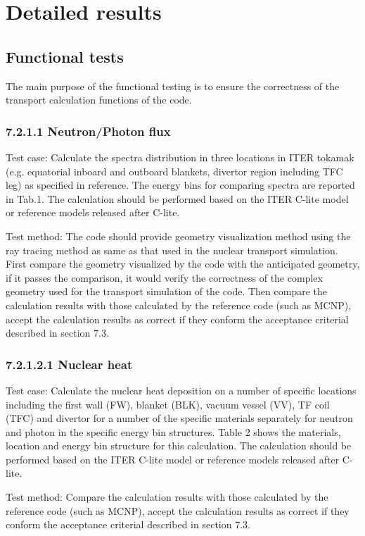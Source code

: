 \section{Detailed results}
\label{detailedresults}

\subsection{Functional tests}
The main purpose of the functional testing is to ensure the correctness of the transport
calculation functions of the code.

\subsubsection{7.2.1.1 Neutron/Photon flux}
Test case: Calculate the spectra distribution in three locations in ITER tokamak (e.g.
equatorial inboard and outboard blankets, divertor region including TFC leg) as
specified in reference. The energy bins for comparing spectra are reported in Tab.1.
The calculation should be performed based on the ITER C-lite model or reference
models released after C-lite.

Test method: The code should provide geometry visualization method using the ray
tracing method as same as that used in the nuclear transport simulation. First compare
the geometry visualized by the code with the anticipated geometry, if it passes the
comparison, it would verify the correctness of the complex geometry used for the
transport simulation of the code. Then compare the calculation results with those
calculated by the reference code (such as MCNP), accept the calculation results as
correct if they conform the acceptance criterial described in section 7.3.

\subsubsection{7.2.1.2.1 Nuclear heat}
Test case: Calculate the nuclear heat deposition on a number of specific locations
including the first wall (FW), blanket (BLK), vacuum vessel (VV), TF coil (TFC) and
divertor for a number of the specific materials separately for neutron and photon in the
specific energy bin structures. Table 2 shows the materials, location and energy bin
structure for this calculation. The calculation should be performed based on the ITER
C-lite model or reference models released after C-lite.

Test method: Compare the calculation results with those calculated by the reference
code (such as MCNP), accept the calculation results as correct if they conform the
acceptance criterial described in section 7.3.

